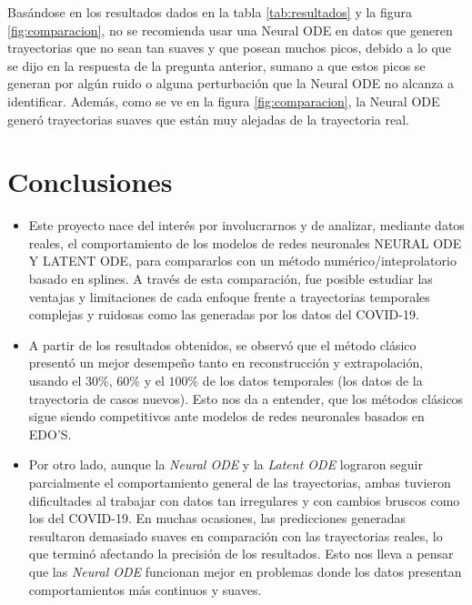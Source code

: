 \documentclass[11pt,letterpaper]{article}
\begin{document}
Basándose en los resultados dados en la tabla \ref{tab:resultados} y la figura \ref{fig:comparacion}, no se recomienda usar una Neural ODE en datos que generen trayectorias que no sean tan suaves y que posean muchos picos, debido a lo que se dijo en la respuesta de la pregunta anterior, sumano a que estos picos se generan por algún ruido o alguna perturbación que la Neural ODE no alcanza a identificar.  Además, como se ve en la figura \ref{fig:comparacion}, la Neural ODE generó trayectorias suaves que están muy alejadas de la trayectoria real.

\section{Conclusiones}
\begin{itemize}
    \item Este proyecto nace del interés por involucrarnos y de analizar, mediante datos reales, el comportamiento de los modelos de redes neuronales NEURAL ODE Y LATENT ODE, para compararlos con un método numérico/inteprolatorio basado en splines. A través de esta comparación, fue posible estudiar las ventajas y limitaciones de cada enfoque frente a trayectorias temporales complejas y ruidosas como las generadas por los datos del COVID-19. 

    \item A partir de los resultados obtenidos, se observó que el método clásico presentó un mejor desempeño tanto en reconstrucción y extrapolación, usando el $30\%$, $60\%$ y el $100\%$ de los datos temporales (los datos de la trayectoria de casos nuevos). Esto nos da a entender, que los métodos clásicos sigue siendo competitivos ante modelos de redes neuronales basados en EDO'S.

    \item Por otro lado, aunque la \textit{Neural ODE} y la \textit{Latent ODE} lograron seguir parcialmente el comportamiento general de las trayectorias, ambas tuvieron dificultades al trabajar con datos tan irregulares y con cambios bruscos como los del COVID-19. En muchas ocasiones, las predicciones generadas resultaron demasiado suaves en comparación con las trayectorias reales, lo que terminó afectando la precisión de los resultados. Esto nos lleva a pensar que las \textit{Neural ODE} funcionan mejor en problemas donde los datos presentan comportamientos más continuos y suaves.


\end{itemize}
\end{document}
